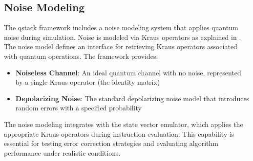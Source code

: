 \subsection{Noise Modeling}

The qstack framework includes a noise modeling system that applies quantum noise during simulation. Noise is modeled via Kraus operators as explained in \cite{wilde2013quantum, nielsen&chuang}. The noise model defines an interface for retrieving Kraus operators associated with quantum operations. The framework provides:

\begin{itemize}
\item \textbf{Noiseless Channel}: An ideal quantum channel with no noise, represented by a single Kraus operator (the identity matrix)
\item \textbf{Depolarizing Noise}: The standard depolarizing noise model that introduces random errors with a specified probability
\end{itemize}

The noise modeling integrates with the state vector emulator, which applies the appropriate Kraus operators during instruction evaluation. This capability is essential for testing error correction strategies and evaluating algorithm performance under realistic conditions.
